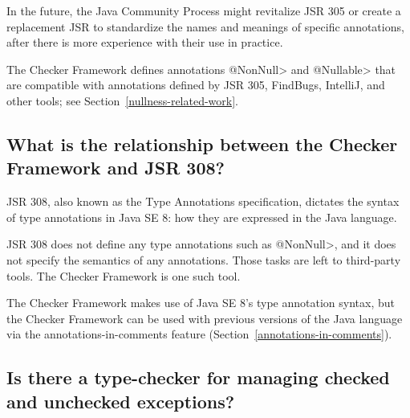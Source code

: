 In the future, the Java Community Process might revitalize JSR 305 or
create a replacement JSR to standardize the names and
meanings of specific annotations, after there is more experience with their
use in practice.



The Checker Framework defines annotations \<@NonNull> and \<@Nullable> that
are compatible with annotations defined by JSR 305, FindBugs, IntelliJ, and
other tools; see Section~\ref{nullness-related-work}.


\subsection{What is the relationship between the Checker Framework and JSR 308?\label{faq-jsr-308}}

JSR 308, also known as the Type Annotations specification, dictates the
syntax of type annotations in Java SE 8:  how they are expressed in the
Java language.

JSR 308 does not define any type annotations such as \<@NonNull>, and it does
not specify the semantics of any annotations.  Those tasks are left to
third-party tools.  The Checker Framework is one such tool.

The Checker Framework makes use of Java SE 8's type annotation syntax, but
the Checker Framework can
be used with previous versions of the Java language via the
annotations-in-comments feature (Section~\ref{annotations-in-comments}).


\subsection{Is there a type-checker for managing checked and unchecked exceptions?\label{faq-checked-exceptions}}

